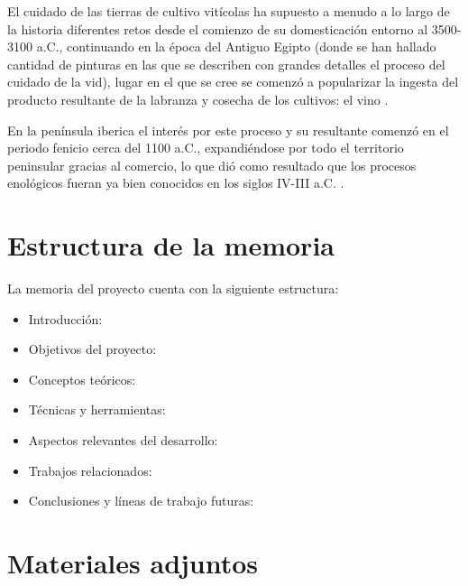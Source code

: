 El cuidado de las tierras de cultivo vitícolas ha supuesto a menudo a lo largo 
de la historia diferentes retos desde el comienzo de su domesticación entorno al 
3500-3100 a.C., continuando en la época del Antiguo Egipto (donde se han hallado 
cantidad de pinturas en las que se describen con grandes detalles el proceso
del cuidado de la vid), lugar en el que se cree se comenzó a popularizar la ingesta
del producto resultante de la labranza y cosecha de los cultivos: el vino \cite{alma991002270696805771}.

En la península iberica el interés por este proceso y su resultante comenzó en el 
periodo fenicio cerca del 1100 a.C., expandiéndose por todo el territorio peninsular
gracias al comercio, lo que dió como resultado que los procesos enológicos fueran ya bien
conocidos en los siglos IV-III a.C. \cite{alma991002270696805771, MAPA_Historia}.


\section{Estructura de la memoria}
La memoria del proyecto cuenta con la siguiente estructura:
\begin{itemize}
    \item Introducción:
    \item Objetivos del proyecto:
    \item Conceptos teóricos:
    \item Técnicas y herramientas:
    \item Aspectos relevantes del desarrollo:
    \item Trabajos relacionados:
    \item Conclusiones y líneas de trabajo futuras:
\end{itemize}

\section{Materiales adjuntos}


